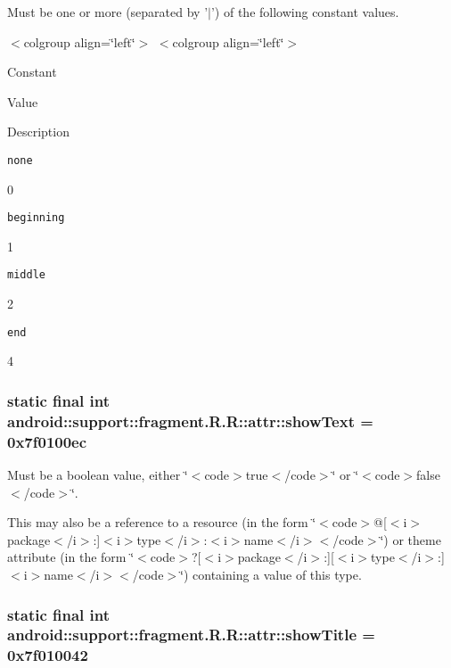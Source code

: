 Must be one or more (separated by '$|$') of the following constant values. \begin{TabularC}{0}
\hline
\end{TabularC}
$<$colgroup align=\char`\"{}left\char`\"{}$>$ $<$colgroup align=\char`\"{}left\char`\"{}$>$ 

Constant

Value

Description 

{\tt none}

0

{\tt beginning}

1

{\tt middle}

2

{\tt end}

4\hypertarget{classandroid_1_1support_1_1fragment_1_1_r_1_1attr_815bb33eb466ecadcac1ae065f410e21}{
\subsubsection[{showText}]{\setlength{\rightskip}{0pt plus 5cm}static final int android::support::fragment.R.R::attr::showText = 0x7f0100ec}}
\label{classandroid_1_1support_1_1fragment_1_1_r_1_1attr_815bb33eb466ecadcac1ae065f410e21}


Must be a boolean value, either \char`\"{}$<$code$>$true$<$/code$>$\char`\"{} or \char`\"{}$<$code$>$false$<$/code$>$\char`\"{}. 

This may also be a reference to a resource (in the form \char`\"{}$<$code$>$@\mbox{[}$<$i$>$package$<$/i$>$:\mbox{]}$<$i$>$type$<$/i$>$:$<$i$>$name$<$/i$>$$<$/code$>$\char`\"{}) or theme attribute (in the form \char`\"{}$<$code$>$?\mbox{[}$<$i$>$package$<$/i$>$:\mbox{]}\mbox{[}$<$i$>$type$<$/i$>$:\mbox{]}$<$i$>$name$<$/i$>$$<$/code$>$\char`\"{}) containing a value of this type. \hypertarget{classandroid_1_1support_1_1fragment_1_1_r_1_1attr_20c7c940b7ab6308ff5859d7ce3dbb86}{
\subsubsection[{showTitle}]{\setlength{\rightskip}{0pt plus 5cm}static final int android::support::fragment.R.R::attr::showTitle = 0x7f010042}}
\label{classandroid_1_1support_1_1fragment_1_1_r_1_1attr_20c7c940b7ab6308ff5859d7ce3dbb86}



